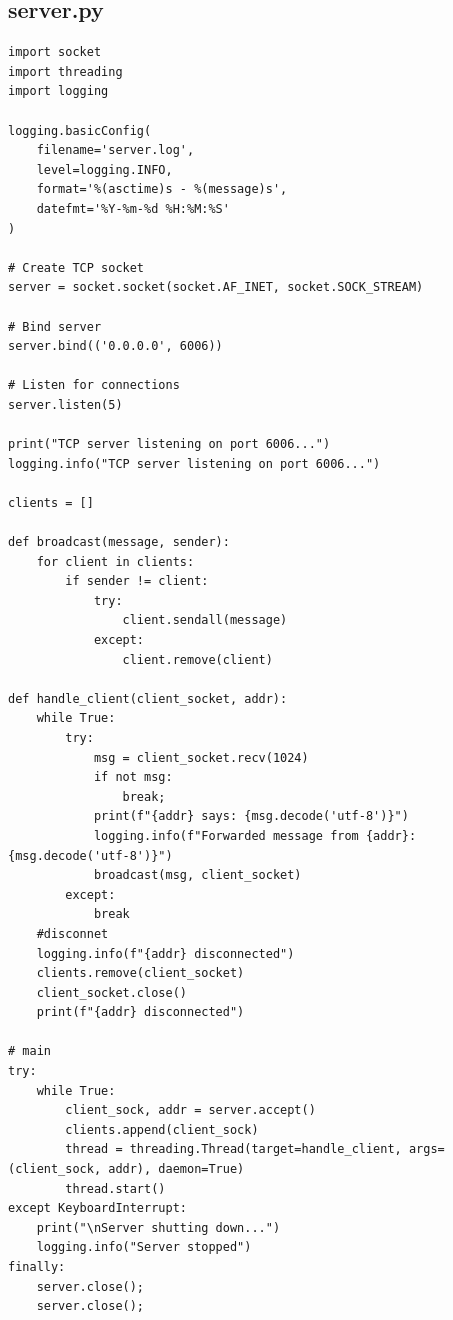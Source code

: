 \documentclass[11pt,a4paper]{article}
\begin{document}
\subsection*{server.py}
\begin{lstlisting}[style=labcode]
import socket
import threading 
import logging

logging.basicConfig(
    filename='server.log',
    level=logging.INFO,
    format='%(asctime)s - %(message)s',
    datefmt='%Y-%m-%d %H:%M:%S'
)

# Create TCP socket
server = socket.socket(socket.AF_INET, socket.SOCK_STREAM)

# Bind server
server.bind(('0.0.0.0', 6006))

# Listen for connections
server.listen(5)

print("TCP server listening on port 6006...")
logging.info("TCP server listening on port 6006...")

clients = []

def broadcast(message, sender):
    for client in clients:
        if sender != client:
            try:
                client.sendall(message)
            except:
                client.remove(client)

def handle_client(client_socket, addr):
    while True:
        try:
            msg = client_socket.recv(1024)
            if not msg:
                break;
            print(f"{addr} says: {msg.decode('utf-8')}")
            logging.info(f"Forwarded message from {addr}: {msg.decode('utf-8')}")
            broadcast(msg, client_socket)
        except:
            break
    #disconnet
    logging.info(f"{addr} disconnected")
    clients.remove(client_socket)
    client_socket.close()
    print(f"{addr} disconnected")
   
# main
try:
    while True:
        client_sock, addr = server.accept()
        clients.append(client_sock)
        thread = threading.Thread(target=handle_client, args=(client_sock, addr), daemon=True)
        thread.start()
except KeyboardInterrupt:
    print("\nServer shutting down...")
    logging.info("Server stopped")
finally:
    server.close();
    server.close();
\end{lstlisting}
\end{document}
